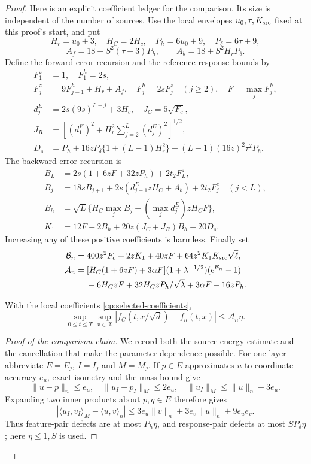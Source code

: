 \begin{proof}
Here is an explicit coefficient ledger for the comparison. Its size is
independent of the number of sources. Use the local envelopes
$u_0,\tau,K_{\rm src}$ fixed at this proof's start, and put
\[
 H_r=u_0+3,\quad H_C=2H_c,\quad
 P_h=6u_0+9,\quad P_\delta=6\tau+9,
\]
\[
 A_f=18+S^2(\tau+3)P_h,\qquad
 A_b=18+S^2H_rP_\delta.
\]
Define the forward-error recursion and the reference-response bounds by
\begin{align*}
 F_1^z&=1,\quad F_1^h=2s,\\
 F_j^z&=9F_{j-1}^h+H_r+A_f,\quad
 F_j^h=2sF_j^z\quad(j\ge2),\quad F=\max_jF_j^h,\\
 d_j^E&=2s(9s)^{L-j}+3H_c,\quad J_C=5\sqrt{F_c},\\
 J_R&=\left[(d_1^E)^2+H_r^2\sum_{j=2}^L(d_j^E)^2\right]^{1/2},\\
 D_s&=P_h+16zP_\delta\{1+(L-1)H_r^2\}
                   +(L-1)(16z)^2\tau^2P_h.
\end{align*}
The backward-error recursion is
\begin{align*}
 B_L&=2s(1+6zF+32zP_h)+2t_2F_L^z,\\
 B_j&=18sB_{j+1}+2s(d_{j+1}^EzH_C+A_b)+2t_2F_j^z
                       \quad(j<L),\\
 B_h&=\sqrt L\{H_C\max_jB_j+(\max_jd_j^E)zH_CF\},\\
 K_1&=12F+2B_h+20z(J_C+J_R)B_h+20D_s.
\end{align*}
Increasing any of these positive coefficients is harmless. Finally set
\begin{align}
 \mathcal B_n={}&400z^2F_c+2zK_1+40zF
                         +64z^2K_1K_{\rm src}\sqrt\ell,\nonumber\\
 \mathcal A_n={}&[H_C(1+6zF)+3\alpha F]
             (1+\lambda^{-1/2})(e^{\mathcal B_n}-1)\nonumber\\
 &+6H_CzF+32H_CzP_h/\sqrt\lambda+3\alpha F+16zP_h.
 \label{cp:selected-coefficients}
\end{align}

\begin{claim}
With the local coefficients \eqref{cp:selected-coefficients},
\[
 \sup_{0\le t\le T}\sup_{x\in\mathcal X}
 |f_C(t,x/\sqrt d)-f_n(t,x)|\le\mathcal A_n\eta.
\]
\end{claim}
\begin{proof}[Proof of the comparison claim]
We record both the source-energy estimate and the cancellation that
make the parameter dependence possible. For one layer abbreviate
$E=E_j$, $I=I_j$ and $M=M_j$. If $p\in E$ approximates $u$
to coordinate accuracy $e_u$, exact isometry and the mass bound give
\[
 \|u-p\|_n\le e_u,\quad \|u_I-p_I\|_M\le2e_u,
 \quad\|u_I\|_M\le\|u\|_n+3e_u.
\]
Expanding two inner products about $p,q\in E$ therefore gives
\begin{equation}
 |\langle u_I,v_I\rangle_M-\langle u,v\rangle_n|
 \le3e_u\|v\|_n+3e_v\|u\|_n+9e_ue_v.
 \label{cp:pair-defect}
\end{equation}
Thus feature-pair defects are at most $P_h\eta$, and response-pair
defects at most $SP_\delta\eta$; here $\eta\le1,S$ is used.


\end{proof}
\end{proof}
